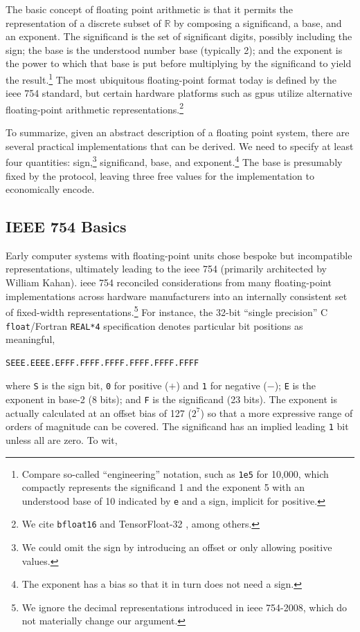 \documentclass[twoside]{article}
\begin{document}
The basic concept of floating point arithmetic is that it permits the representation of a discrete subset of $\mathbb{R}$ by composing a significand, a base, and an exponent.  The significand is the set of significant digits, possibly including the sign; the base is the understood number base (typically 2); and the exponent is the power to which that base is put before multiplying by the significand to yield the result.\footnote{Compare so-called “engineering” notation, such as \texttt{1e5} for 10,000, which compactly represents the significand 1 and the exponent 5 with an understood base of 10 indicated by \texttt{e} and a sign, implicit for positive.}  The most ubiquitous floating-point format today is defined by the {\sc ieee} 754 standard, but certain hardware platforms such as {\sc gpu}s utilize alternative floating-point arithmetic representations.\footnote{We cite \texttt{bfloat16} \citep{Wang2019} and TensorFloat-32 \citep{Kharva2020}, among others.}

To summarize, given an abstract description of a floating point system, there are several practical implementations that can be derived.  We need to specify at least four quantities:  sign,\footnote{We could omit the sign by introducing an offset or only allowing positive values.} significand, base, and exponent.\footnote{The exponent has a bias so that it in turn does not need a sign.}  The base is presumably fixed by the protocol, leaving three free values for the implementation to economically encode.


\subsection[\textsc{ieee} 754 Basics]{IEEE 754 Basics}

Early computer systems with floating-point units chose bespoke but incompatible representations, ultimately leading to the {\sc ieee} 754 (primarily architected by William Kahan).  {\sc ieee} 754 reconciled considerations from many floating-point implementations across hardware manufacturers into an internally consistent set of fixed-width representations.\footnote{We ignore the decimal representations introduced in {\sc ieee} 754-2008, which do not materially change our argument.}  For instance, the 32-bit “single precision” C \texttt{float}/Fortran \texttt{REAL*4} specification denotes particular bit positions as meaningful,

\begin{lstlisting}[style=listingcode]
SEEE.EEEE.EFFF.FFFF.FFFF.FFFF.FFFF.FFFF
\end{lstlisting}
\noindent
where \texttt{S} is the sign bit, \texttt{0} for positive ($+$) and \texttt{1} for negative ($-$); \texttt{E} is the exponent in base-2 (8 bits); and \texttt{F} is the significand (23 bits).  The exponent is actually calculated at an offset bias of 127 ($2^{7}$) so that a more expressive range of orders of magnitude can be covered.  The significand has an implied leading \texttt{1} bit unless all are zero.  To wit,
\end{document}
